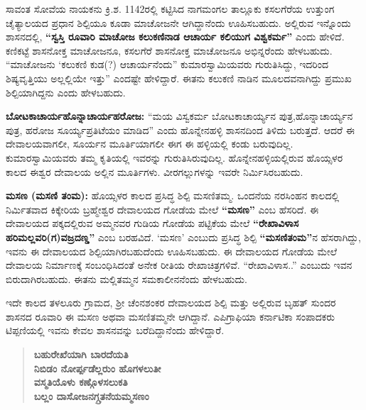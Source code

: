 ಸಾವಂತ ಸೋವೆಯ ನಾಯಕನು ಕ್ರಿ.ಶ. 1142ರಲ್ಲಿ ಕಟ್ಟಿಸಿದ ನಾಗಮಂಗಲ ತಾಲ್ಲೂಕು ಕಸಲಗೆರೆಯ ಉತ್ತುಂಗ ಚೈತ್ಯಾಲಯದ ಪ್ರಧಾನ ಶಿಲ್ಪಿಯೂ ಕೂಡಾ ಮಾಚೋಜನೇ ಆಗಿದ್ದಾನೆಂದು ಊಹಿಸಬಹುದು. ಅಲ್ಲಿರುವ ಇನ್ನೊಂದು ಶಾಸನದಲ್ಲಿ, \textbf{“ಸ್ವಸ್ತಿ ರೂವಾರಿ ಮಾಚೋಜ ಕಲುಕಣಿನಾಡ ಆಚಾರ್ಯ ಕಲಿಯುಗ ವಿಶ್ವಕರ್ಮ”} ಎಂದು ಹೇಳಿದೆ. ಕಣಿಕಟ್ಟೆ ಶಾಸನೋಕ್ತ ಮಾಚೋಜನೂ, ಕಸಲಗೆರೆ ಶಾಸನೋಕ್ತ ಮಾಚೋಜನೂ ಅಭಿನ್ನರೆಂದು ಹೇಳಬಹುದು. “ಮಾಚೋಜನು ‘ಕಲುಕಣಿ ಕುಡ(?) ಆಚಾರ್ಯನೆಂದು” ಕುಮಾರಸ್ವಾಮಿಯವರು ಗುರುತಿಸಿದ್ದು, ಇದರಿಂದ ಶಿಷ್ಯವೃತ್ತಿಯು ಅಲ್ಲಲ್ಲಿಯೇ ಇತ್ತು” ಎಂದಷ್ಟೇ ಹೇಳಿದ್ದಾರೆ. ಈತನು ಕಲುಕಣಿ ನಾಡಿನ ಮೂಲದವನಾಗಿದ್ದು ಪ್ರಮುಖ ಶಿಲ್ಪಿಯಾಗಿದ್ದನು ಎಂದು ಹೇಳಬಹುದು.

\textbf{ಬೋಟಕಾಚಾರ್ಯ\general{\enginline{-}}ಹೊನ್ನಾಚಾರ್ಯ\general{\enginline{-}}ಹರೋಜ:} “ಮಯ ವಿಸ್ವಕರ್ಮ ಬೋಟಕಾಚಾರ್ಯ್ಯನ ಪುತ್ರ,\break ಹೊನ್ನಾಚಾರ್ಯ್ಯನ ಪುತ್ರ, ಹರೋಜ ಸೂರ್ಯ್ಯಪ್ರತಿಟೆಯಂ ಮಾಡಿದ” ಎಂದು ಹೊನ್ನೇನಹಳ್ಳಿ ಶಾಸನದಿಂದ ತಿಳಿದು ಬರುತ್ತದೆ. ಆದರೆ ಈ ದೇವಾಲಯವಾಗಲೀ, ಸೂರ್ಯನ ಮೂರ್ತಿಯಾಗಲೀ ಈಗ ಈ ಹಳ್ಳಿಯಲ್ಲಿ ಕಂಡು ಬರುವುದಿಲ್ಲ. ಕುಮಾರಸ್ವಾಮಿಯವರು ತಮ್ಮ ಕೃತಿಯಲ್ಲಿ ಇವರನ್ನು ಗುರುತಿಸಿರುವುದಿಲ್ಲ. ಹೊನ್ನೇನಹಳ್ಳಿಯಲ್ಲಿರುವ ಹೊಯ್ಸಳರ ಕಾಲದ ಈಶ್ವರ ದೇವಾಲಯ ಅಲ್ಲಿನ ಮೂರ್ತಿಗಳು. ವೀರಗಲ್ಲುಗಳನ್ನು ಇವರೇ ನಿರ್ಮಿಸಿರಬಹುದು. 

\textbf{ಮಸಣ (ಮಸಣಿ ತಂಮ): } ಹೊಯ್ಸಳರ ಕಾಲದ ಪ್ರಸಿದ್ಧ ಶಿಲ್ಪಿ ಮಸಣಿತಮ್ಮ. ಒಂದನೆಯ ನರಸಿಂಹನ ಕಾಲದಲ್ಲಿ ನಿರ್ಮಿತವಾದ ಕಿಕ್ಕೇರಿಯ ಬ್ರಹ್ಮೇಶ್ವರ ದೇವಾಲಯದ ಗೋಡೆಯ ಮೇಲೆ \textbf{“ಮಸಣ”} ಎಂಬ ಹೆಸರಿದೆ. ಈ ದೇವಾಲಯದ ಪಕ್ಕದಲ್ಲಿರುವ ಅಮ್ಮನವರ ಗುಡಿಯ ಗೋಡೆಯ ಪಟ್ಟಿಕೆಯ ಮೇಲೆ \textbf{“ರೇಖಾವಿಳಾಸ ಹರಿಮಲ್ಲವರಿ(ಗ)ವಜ್ರದಣ್ಡ”} ಎಂಬ ಬರಹವಿದೆ. ‘ಮಸಣ’ ಎಂಬುದು ಪ್ರಸಿದ್ಧ ಶಿಲ್ಪಿ \textbf{“ಮಸಣಿತಂಮ”}ನ ಹೆಸರಾಗಿದ್ದು, ಇವನು ಈ ದೇವಾಲಯದ ಶಿಲ್ಪಿಯಾಗಿರ\-ಬಹುದೆಂದು ಊಹಿಸಬಹುದು. ಈ ದೇವಾಲಯದ ಗೋಡೆಯ ಮೇಲೆ ದೇವಾಲಯ ನಿರ್ಮಾಣಕ್ಕೆ ಸಂಬಂಧಿಸಿದಂತೆ ಅನೇಕ ರೀತಿಯ ರೇಖಾಚಿತ್ರಗಳಿವೆ. “ರೇಖಾವಿಳಾಸ..” ಎಂಬುದು ಇವನ ಬಿರುದಾಗಿರಬಹುದು. ಈತನು ಮಲ್ಲಿತಮ್ಮನ ಸಮಕಾಲೀನನೆಂದು ಹೇಳಬಹುದು.

ಇದೇ ಕಾಲದ ತಳಲೂರು ಗ್ರಾಮದ, ಶ‍್ರೀ ಚೆಂನಶಂಕರ ದೇವಾಲಯದ ಶಿಲ್ಪಿ ಮತ್ತು ಅಲ್ಲಿರುವ ಬೃಹತ್​ ಸುಂದರ ಶಾಸನದ ರೂವಾರಿ ಈ ಮಸಣ ಅಥವಾ ಮಸಣಿತಮ್ಮನೇ ಆಗಿದ್ದಾನೆ. ಎಪಿಗ್ರಾಫಿಯಾ ಕರ್ನಾಟಿಕಾ ಸಂಪಾದಕರು ಟಿಪ್ಪಣಿಯಲ್ಲಿ ಇವನು ಕೇವಲ ಶಾಸನವನ್ನು ಬರೆದಿದ್ದಾನೆಂದು ಹೇಳಿದ್ದಾರೆ.

\begin{verse}
\textbf{ಬಹುರೇಖೆಯಾಗಿ ಬಾರದೆಯತಿ} \\\textbf{ನಿಬಿಡಂ ನೋರ್ಪ್ಪಡೆಲ್ಲರುಂ ಹೊಗಳಲುತೀ} \\\textbf{ವಸ್ಮತಿಯೊಳು ಕಣ್ಗೊಳಸಲುಕತಿ} \\\textbf{ಬಲ್ಲಂ ದಾಸೋಜನಗ್ಗ್ರತನೆಯಮ್ಮಸಣಂ}
\end{verse}

